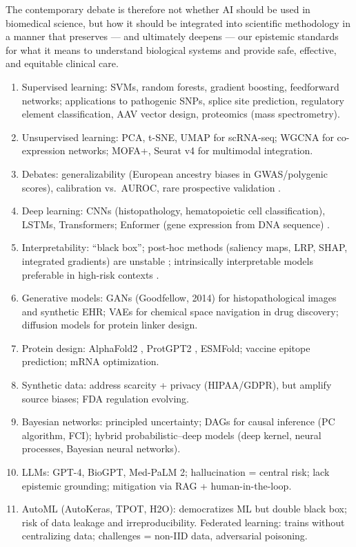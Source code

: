 The contemporary debate is therefore not whether AI should be used in biomedical science, but how it should be integrated into scientific methodology in a manner that preserves --- and ultimately deepens --- our epistemic standards for what it means to understand biological systems and provide safe, effective, and equitable clinical care.

\clearpage
\begin{revise}\small
\begin{enumerate}[itemsep=0pt, topsep=0pt, parsep=0pt]
    \item Supervised learning: SVMs, random forests, gradient boosting, feedforward networks; applications to pathogenic SNPs, splice site prediction, regulatory element classification, AAV vector design, proteomics (mass spectrometry).
    \item Unsupervised learning: PCA, t-SNE, UMAP for scRNA-seq; WGCNA for co-expression networks; MOFA+, Seurat v4 for multimodal integration.
    \item Debates: generalizability (European ancestry biases in GWAS/polygenic scores), calibration vs.\ AUROC, rare prospective validation \parencite{popejoy2016,obermeyer2019}.
    \item Deep learning: CNNs (histopathology, hematopoietic cell classification), LSTMs, Transformers; Enformer (gene expression from DNA sequence) \parencite{avsec2021}.
    \item Interpretability: ``black box''; post-hoc methods (saliency maps, LRP, SHAP, integrated gradients) are unstable \parencite{adebayo2018}; intrinsically interpretable models preferable in high-risk contexts \parencite{rudin2019}.
    \item Generative models: GANs (Goodfellow, 2014) for histopathological images and synthetic EHR; VAEs for chemical space navigation in drug discovery; diffusion models for protein linker design.
    \item Protein design: AlphaFold2 \parencite{jumper2021}, ProtGPT2 \parencite{ferruz2022}, ESMFold; vaccine epitope prediction; mRNA optimization.
    \item Synthetic data: address scarcity + privacy (HIPAA/GDPR), but amplify source biases; FDA regulation evolving.
    \item Bayesian networks: principled uncertainty; DAGs for causal inference (PC algorithm, FCI); hybrid probabilistic--deep models (deep kernel, neural processes, Bayesian neural networks).
    \item LLMs: GPT-4, BioGPT, Med-PaLM 2; hallucination = central risk; lack epistemic grounding; mitigation via RAG + human-in-the-loop.
    \item AutoML (AutoKeras, TPOT, H2O): democratizes ML but double black box; risk of data leakage and irreproducibility. Federated learning: trains without centralizing data; challenges = non-IID data, adversarial poisoning.
\end{enumerate}
\end{revise}

\clearpage

\printbibliography[heading=subbibliography,title={References}]

